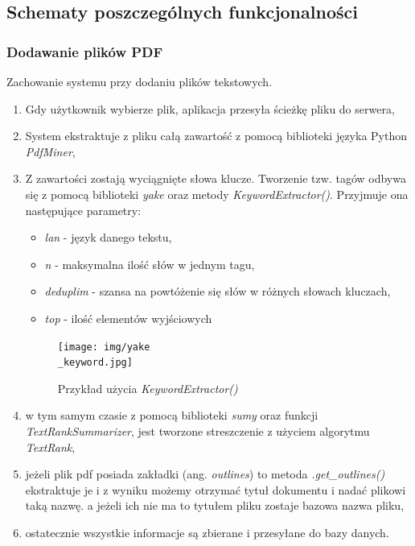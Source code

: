 \documentclass[12pt,a4paper,twoside]{article}
\begin{document}
\subsection{Schematy poszczególnych funkcjonalności}
\subsubsection{Dodawanie plików PDF}
Zachowanie systemu przy dodaniu plików tekstowych.
\begin{enumerate}
	\item Gdy użytkownik wybierze plik, aplikacja przesyła ścieżkę pliku do serwera,
	\item System ekstraktuje z pliku całą zawartość z pomocą biblioteki języka Python \textit{PdfMiner},
	\item Z zawartości zostają wyciągnięte słowa klucze. Tworzenie tzw. tagów odbywa się z pomocą biblioteki \textit{yake} oraz metody \textit{KeywordExtractor()}. Przyjmuje ona następujące parametry:
	\begin{itemize}
		\item \textit{lan} - język danego tekstu,
		\item \textit{n} - maksymalna ilość słów w jednym tagu,
		\item \textit{deduplim} - szansa na powtóżenie się słów w różnych słowach kluczach,
		\item \textit{top} - ilość elementów wyjściowych
	\end{itemize}
	\begin{figure}[h]
		\centering
  		\texttt{[image: img/yake\\\_keyword.jpg]}
  		\caption{Przykład użycia \textit{KeywordExtractor()}}
	\end{figure}
	\item w tym samym czasie z pomocą biblioteki \textit{sumy} oraz funkcji \textit{TextRankSummarizer}, jest tworzone streszczenie z użyciem algorytmu \textit{TextRank},
	\item jeżeli plik pdf posiada zakładki (ang. \textit{outlines}) to metoda \textit{.get\_outlines()} ekstraktuje je i z wyniku możemy otrzymać tytuł dokumentu i nadać plikowi taką nazwę. a jeżeli ich nie ma to tytułem pliku zostaje bazowa nazwa pliku,
	\item ostatecznie wszystkie informacje są zbierane i przesyłane do bazy danych.
\end{enumerate}
\end{document}
